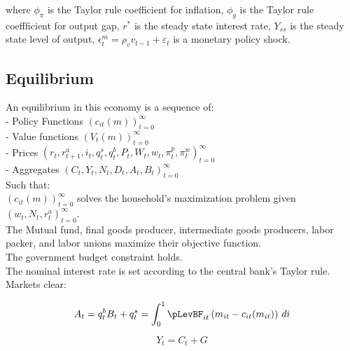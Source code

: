 \documentclass[titlepage]{\econtex}\providecommand{\texname}{BufferStockTheory}
\begin{document}
where $\phi_{\pi}$ is the Taylor rule coefficient for inflation, $\phi_{y}$ is the Taylor rule coeffficient for output gap,  $r^{*}$ is the steady state interest rate, $Y_{ss}$ is the steady state level of output,  $\epsilon^{m}_{t} = \rho_{v} v_{t-1} +\varepsilon_{t}$ is a monetary policy shock. \\

\hypertarget{Equilibrium}{}
\subsection{Equilibrium}


An equilibrium in this economy is a sequence of: \\

- Policy Functions $\left( c_{it}(m) \right )_{t=0}^{\infty}$ \\

- Value functions $ \left( V_{t}(m) \right)_{t=0}^{\infty}$\\

- Prices $ \left(r_{t},  r^{a}_{t+1}, i_{t}, q^{s}_{t}, q^{b}_{t}, P_{t}, W_{t} , w_{t} , \pi^{p}_{t}, \pi^{w}_{t} \right) _{t=0}^{\infty}$\\

- Aggregates $ \left(C_{t}, Y_{t} , N_{t}, D_{t} , A_{t} , B_{t} \right)_{t=0}^{\infty}$\\

Such that: \\

$ \left(  c_{it}(m)\right)_{t=0}^{\infty}$  solves the household's maximization problem given $  \left( w_{t}, N_{t},  r^{a}_{t} \right)_{t=0}^{\infty}$.\\

The Mutual fund, final goods producer, intermediate goods producers, labor packer, and labor unions maximize their objective function. \\

The government budget constraint holds. \\

The nominal interest rate is set according to the central bank's Taylor rule. \\


Markets clear:

 $$ A_t = q^{b}_{t} B_{t} + q^{s}_{t} =  \int_{0}^{1} \pLevBF_{it}\left( m_{it} - c_{it}(m_{it})\right) \, di $$
 
 $$ Y_t = C_{t} +G $$ \\
 
\end{document}
